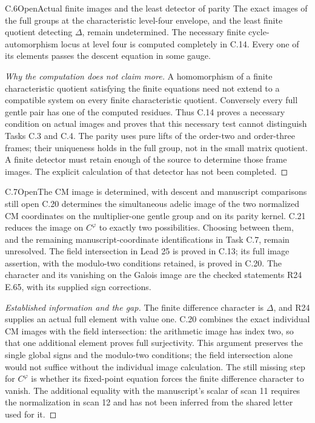 \begin{statement}{C.6}{Open}{Actual finite images and the least detector of parity}
The exact images of the full groups at the characteristic level-four
envelope, and the least finite quotient detecting $\Delta$, remain
undetermined. The necessary finite cycle-automorphism locus at
level four is computed completely in C.14. Every one of its elements
passes the descent equation in some gauge.
\end{statement}
\begin{proof}[Why the computation does not claim more]
A homomorphism of a finite characteristic quotient satisfying the
finite equations need not extend to a compatible system on every
finite characteristic quotient. Conversely every full gentle pair
has one of the computed residues. Thus C.14 proves a necessary
condition on actual images and proves that this necessary test
cannot distinguish Tasks C.3 and C.4. The parity uses pure lifts of
the order-two and order-three frames; their uniqueness holds in the
full group, not in the small matrix quotient. A finite detector must
retain enough of the source to determine those frame images. The
explicit calculation of that detector has not been completed.
\end{proof}

\begin{statement}{C.7}{Open}{The CM image is determined, with descent and manuscript comparisons still open}
C.20 determines the simultaneous adelic image of the two
normalized CM coordinates on the multiplier-one gentle group
and on its parity kernel. C.21 reduces the image on
$C^\varphi$ to exactly two possibilities. Choosing between
them, and the remaining manuscript-coordinate identifications
in Task C.7, remain unresolved. The field intersection in
Lead 25 is proved in C.13; its full image assertion, with
the modulo-two conditions retained, is proved in C.20.
The character and its vanishing on the Galois image are
the checked statements R24 E.65, with its supplied sign corrections.
\end{statement}
\begin{proof}[Established information and the gap]
The finite difference character is $\Delta$, and R24
supplies an actual full element with value one. C.20
combines the exact individual CM images with the field
intersection: the arithmetic image has index two, so
that one additional element proves full surjectivity.
This argument preserves the single global signs and
the modulo-two conditions; the field intersection
alone would not suffice without the individual image
calculation. The still missing step for $C^\varphi$
is whether its fixed-point equation forces the finite
difference character to vanish. The additional equality with the
manuscript's scalar of scan 11 requires the normalization in scan 12
and has not been inferred from the shared letter used for it.
\end{proof}

